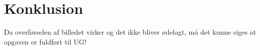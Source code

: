 \graphicspath{{Chapters/Hjulsencor montering/}}

\chapter{Konklusion}
Da overførselen af billedet virker og det ikke bliver ødelagt, må det kunne siges at opgaven er fuldført til UG!